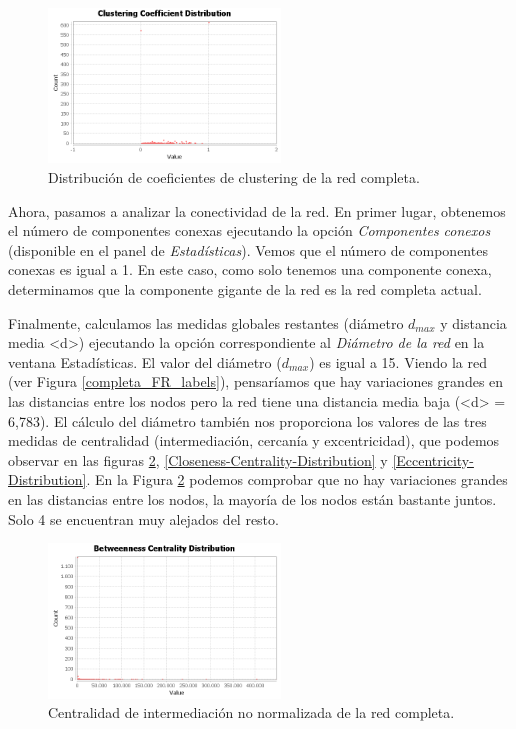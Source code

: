 \documentclass{uimppracticas}
\begin{document}
\begin{figure}[H]
	\centering
	\includegraphics[width=0.55\textwidth]{images/clustering-coefficient}
	\caption{Distribución de coeficientes de clustering de la red completa.}
	\label{clustering-coefficient}
\end{figure}

Ahora, pasamos a analizar la conectividad de la red. En primer lugar, obtenemos el número de componentes conexas ejecutando la opción \textit{Componentes conexos} (disponible en el panel de \textit{Estadísticas}). Vemos  que el número de componentes conexas es igual a 1. En este caso, como solo tenemos una componente conexa, determinamos que la componente gigante de la red es la red completa actual.

Finalmente, calculamos las medidas globales restantes (diámetro $d_{max}$ y distancia media <d>) ejecutando la opción correspondiente al \textit{Diámetro de la red} en la ventana {Estadísticas}. El valor del diámetro ($d_{max}$) es igual a 15. Viendo la red (ver Figura \ref{completa_FR_labels}), pensaríamos que hay variaciones grandes en las distancias entre los nodos pero la red tiene una distancia media baja (<d> = 6,783). El cálculo del diámetro también nos proporciona los valores de las tres medidas de centralidad (intermediación, cercanía y excentricidad), que podemos observar en las figuras \ref{Betweenness-Centrality-Distribution}, \ref{Closeness-Centrality-Distribution} y \ref{Eccentricity-Distribution}. En la Figura \ref{Betweenness-Centrality-Distribution} podemos comprobar que no hay variaciones grandes en las distancias entre los nodos, la mayoría de los nodos están bastante juntos. Solo 4 se encuentran muy alejados del resto.

\begin{figure}[H]
	\centering
	\includegraphics[width=0.55\textwidth]{images/Betweenness-Centrality-Distribution}
	\caption{Centralidad de intermediación no normalizada de la red completa.}
	\label{Betweenness-Centrality-Distribution}
\end{figure}
\end{document}
